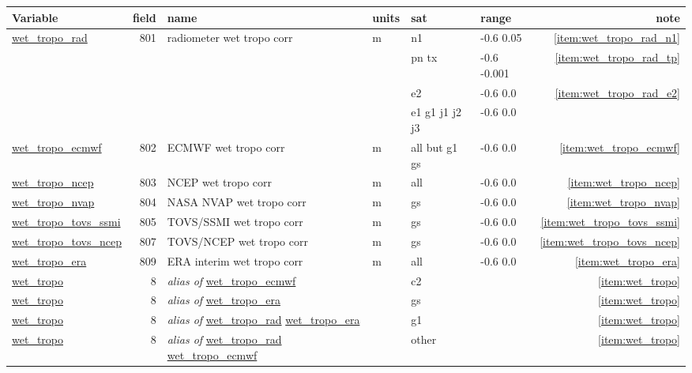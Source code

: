 \documentclass[a4paper,11pt,openany,natbib,nomargin]{thesis}
\makeatletter
\newcommand\var[1]{\url{#1}\index{variables!#1@\protect\url{#1}}}
\newcommand\alias[1]{\emph{alias of} \var{#1}}
\newenvironment{vartable}{
\begin{table}[ht]
\small
\begin{tabular}{lrllllr}
\hline
Variable & field & name & units & sat & range & note \\
\hline
}{
\hline
\end{tabular}
\end{table}
}
\makeatother
\begin{document}
\begin{vartable}
\var{wet_tropo_rad} & 801 & radiometer wet tropo corr & m & n1 & -0.6 0.05 & \ref{item:wet_tropo_rad_n1} \\
                    &     &                           &   & pn tx & -0.6 -0.001 & \ref{item:wet_tropo_rad_tp} \\
                    &     &                           &   & e2 & -0.6 0.0 & \ref{item:wet_tropo_rad_e2} \\
                    &     &                           &   & e1 g1 j1 j2 j3 & -0.6 0.0 & \\
\var{wet_tropo_ecmwf} & 802 & ECMWF wet tropo corr    & m & all but g1 gs & -0.6 0.0 & \ref{item:wet_tropo_ecmwf} \\
\var{wet_tropo_ncep} & 803 & NCEP wet tropo corr      & m & all & -0.6 0.0 & \ref{item:wet_tropo_ncep} \\
\var{wet_tropo_nvap} & 804 & NASA NVAP wet tropo corr & m & gs & -0.6 0.0 & \ref{item:wet_tropo_nvap} \\
\var{wet_tropo_tovs_ssmi} & 805 & TOVS/SSMI wet tropo corr & m & gs & -0.6 0.0 & \ref{item:wet_tropo_tovs_ssmi} \\
\var{wet_tropo_tovs_ncep} & 807 & TOVS/NCEP wet tropo corr & m & gs & -0.6 0.0 & \ref{item:wet_tropo_tovs_ncep} \\
\var{wet_tropo_era} & 809 & ERA interim wet tropo corr & m & all & -0.6 0.0 & \ref{item:wet_tropo_era} \\
\hline
\var{wet_tropo} & 8 & \alias{wet_tropo_ecmwf} & & c2 & & \ref{item:wet_tropo} \\
\var{wet_tropo} & 8 & \alias{wet_tropo_era} & & gs & & \ref{item:wet_tropo} \\
\var{wet_tropo} & 8 & \alias{wet_tropo_rad} \var{wet_tropo_era} & & g1 & & \ref{item:wet_tropo} \\
\var{wet_tropo} & 8 & \alias{wet_tropo_rad} \var{wet_tropo_ecmwf} & & other & & \ref{item:wet_tropo} \\
\end{vartable}
\end{document}
